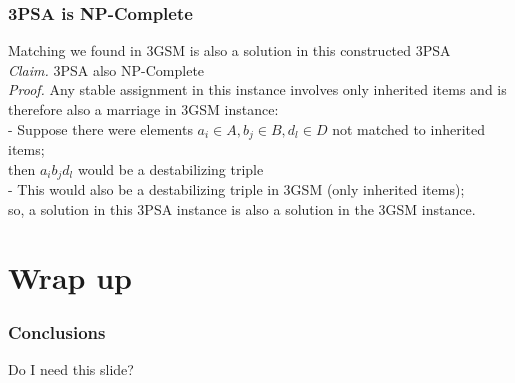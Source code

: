 \documentclass[mathserif,serif]{beamer}
\begin{document}
\begin{frame}
	\frametitle{3PSA is NP-Complete} 
		Matching we found in 3GSM is also a solution in this constructed 3PSA \\
		\newline
		\emph{Claim.} 3PSA also NP-Complete\\
		\emph{Proof.} Any stable assignment in this instance involves only inherited items and is
	therefore also a marriage in 3GSM instance: \\
			- Suppose there were elements $a_i \in A, b_j \in B, d_l \in D$ not matched to inherited items;\\
			then $a_i b_j d_l$ would be a destabilizing triple\\ %
			- This would also be a destabilizing triple in 3GSM (only inherited items);\\
			so, a solution in this 3PSA instance is also a solution in the 3GSM instance. \\
	
\end{frame}

\section{Wrap up}

\begin{frame}

	\frametitle{Conclusions}
	
	Do I need this slide?
	
\end{frame}
\end{document}
